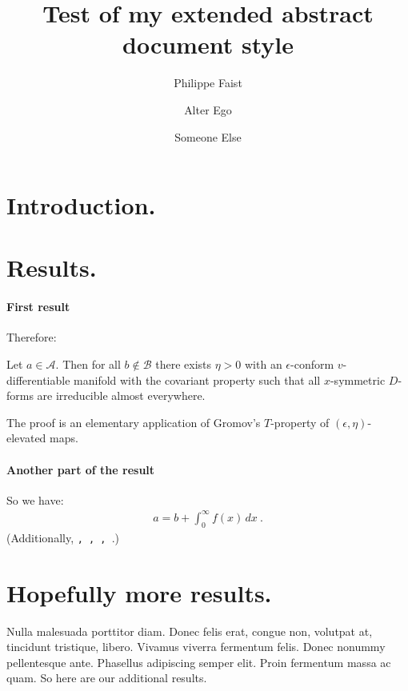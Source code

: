 \documentclass[
    papertype=a4paper,
]{phfextendedabstract}
\begin{document}
\title{Test of my extended abstract document style}
\author{Philippe Faist}
\author{Alter Ego}
\author{Someone Else}
\maketitle


\section{Introduction.}
\lipsum[1]

\section{Results.}
\lipsum[2]

\paragraph{First result}
\lipsum[3]
Therefore:

\begin{theorem}
  Let $a\in \mathcal{A}$.  Then for all $b\notin\mathcal{B}$ there exists
  $\eta>0$ with an $\epsilon$-conform $v$-differentiable manifold with the
  covariant property such that all $x$-symmetric $D$-forms are irreducible
  almost everywhere.
\end{theorem}

The proof is an elementary application of Gromov's $T$-property of
$(\epsilon,\eta)$-elevated maps.

\paragraph{Another part of the result}
\lipsum[4]
So we have:
\begin{align}
  a = b + \int_0^\infty f(x)\,dx\ .
\end{align}
(Additionally, \texttt{\the\abovedisplayskip, \the\belowdisplayskip,
  \the\abovedisplayshortskip, \the\belowdisplayshortskip}.)

\lipsum[5]


\section{Hopefully more results.}
Nulla malesuada porttitor diam. Donec felis erat, congue non, volutpat at,
tincidunt tristique, libero. Vivamus viverra fermentum felis. Donec nonummy
pellentesque ante. Phasellus adipiscing semper elit. Proin fermentum massa ac
quam.   So here are our additional results.
\end{document}
